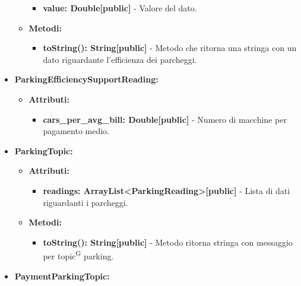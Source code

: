 \documentclass[8pt]{article}
\newcommand{\glossterm}[1]{#1\textsuperscript{G}} %
\begin{document}
\begin{itemize}
\begin{itemize}
\begin{itemize}
            \item \textbf{value: Double[public]} - Valore del dato.
        \end{itemize}
    \end{itemize}
    \begin{itemize}
	\setlength\itemsep{0em}
        \item \textbf{Metodi:}
        \begin{itemize}
	\setlength\itemsep{0em}
            \item \textbf{toString(): String[public]} - Metodo che ritorna una stringa con un dato riguardante l'efficienza dei parcheggi.
        \end{itemize}
    \end{itemize}
    \item \textbf{ParkingEfficiencySupportReading:}
    \begin{itemize}
	\setlength\itemsep{0em}
        \item \textbf{Attributi:}
        \begin{itemize}
	\setlength\itemsep{0em}
            \item \textbf{cars\_per\_avg\_bill: Double[public]} - Numero di macchine per pagamento medio.
        \end{itemize}
    \end{itemize}
    \item \textbf{ParkingTopic:}
    \begin{itemize}
	\setlength\itemsep{0em}
        \item \textbf{Attributi:}
        \begin{itemize}
	\setlength\itemsep{0em}
            \item \textbf{readings: ArrayList<ParkingReading>[public]} - Lista di dati riguardanti i parcheggi.
        \end{itemize}
    \end{itemize}
    \begin{itemize}
	\setlength\itemsep{0em}
        \item \textbf{Metodi:}
        \begin{itemize}
	\setlength\itemsep{0em}
            \item \textbf{toString(): String[public]} - Metodo ritorna stringa con messaggio per \glossterm{topic} parking.
        \end{itemize}
    \end{itemize}
    \item \textbf{PaymentParkingTopic:}
    \begin{itemize}

\end{itemize}
\end{itemize}
\end{document}
